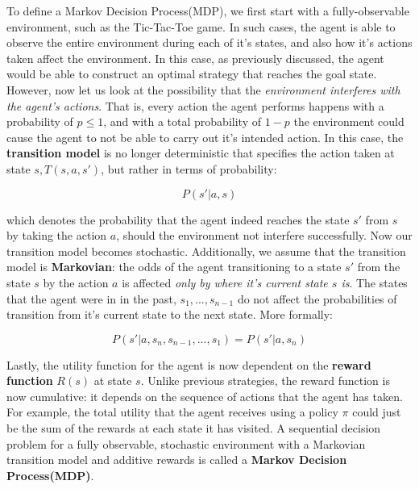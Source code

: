 \documentclass[12pt]{article}
\begin{document}
To define a Markov Decision Process(MDP), we first start with a fully-observable environment, such as the Tic-Tac-Toe game. In such cases, the agent is able to observe the entire environment during each of it's states, and also how it's actions taken affect the environment. In this case, as previously discussed, the agent would be able to construct an optimal strategy that reaches the goal state.\\

However, now let us look at the possibility that the \textit{environment interferes with the agent's actions}. That is, every action the agent performs happens with a probability of $p \leq 1$, and with a total probability of $1-p$ the environment could cause the agent to not be able to carry out it's intended action. In this case, the \textbf{transition model} is no longer deterministic that specifies the action taken at state $s, T(s, a, s')$, but rather in terms of probability:

\begin{equation*}
P(s' | a, s)
\end{equation*}

which denotes the probability that the agent indeed reaches the state $s'$ from $s$ by taking the action $a$, should the environment not interfere successfully. Now our transition model becomes stochastic. Additionally, we assume that the transition model is \textbf{Markovian}: the odds of the agent transitioning to a state $s'$ from the state $s$ by the action $a$ is affected \textit{only by where it's current state $s$ is}. The states that the agent were in in the past, $s_1, ..., s_{n-1}$ do not affect the probabilities of transition from it's current state to the next state. More formally:

\begin{equation*}
P(s' |a, s_n, s_{n-1},..., s_1) =  P(s' |a, s_n)
\end{equation*}

Lastly, the utility function for the agent is now dependent on the \textbf{reward function} $R(s)$ at state $s$. Unlike previous strategies, the reward function is now cumulative: it depends on the sequence of actions that the agent has taken. For example, the total utility that the agent receives using a policy $\pi$ could just be the sum of the rewards at each state it has visited. A sequential decision problem for a fully observable, stochastic environment with a Markovian transition model and additive rewards is called a \textbf{Markov Decision Process(MDP)}.
\end{document}
